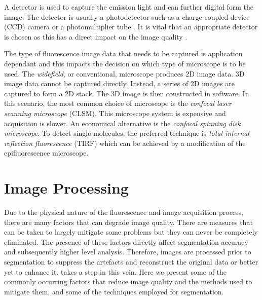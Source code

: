 \begin{definition}[Detector]
	A detector is used to capture the emission light and can further digital form the image.
	The detector is usually a photodetector such as a charge-coupled device (CCD) camera or a photomultiplier tube \citep{Spring2003,Murphy2001}.
	It is vital that an appropriate detector is chosen as this has a direct impact on the image quality \citep{Fatima2008}.
\end{definition}

The type of fluorescence image data that needs to be captured is application dependant and this impacts the decision on which type of microscope is to be used.
The \textit{widefield}, or conventional, microscope produces 2D image data.
3D image data cannot be captured directly.
Instead, a series of 2D images are captured to form a 2D stack. The 3D image is then constructed in software.
In this scenario, the most common choice of microscope is the \textit{confocal laser scanning microscope} (CLSM).
This microscope system is expensive and acquisition is slower.
An economical alternative is the \textit{confocal spinning disk microscope}.
To detect single molecules, the preferred technique is \textit{total internal reflection fluorescence} (TIRF) which can be achieved by a modification of the epifluorescence microscope.


\section{Image Processing}
\label{sec:ImageProcessing}

Due to the physical nature of the fluorescence and image acquisition process, there are many factors that can degrade image quality.
There are measures that can be taken to largely mitigate some problems but they can never be completely eliminated.
The presence of these factors directly affect segmentation accuracy and subsequently higher level analysis.
Therefore, images are processed prior to segmentation to suppress the artefacts and reconstruct the original data \citep{Danek2012} or better yet to enhance it.
 takes a step in this vein.
Here we present some of the commonly occurring factors that reduce image quality and the methods used to mitigate them, and some of the techniques employed for segmentation.

